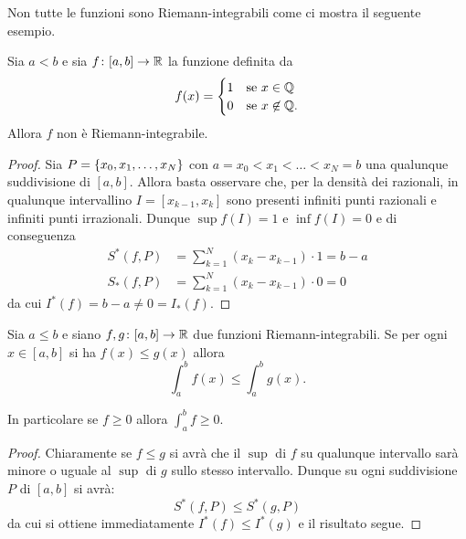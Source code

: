 Non tutte le funzioni sono Riemann-integrabili come ci mostra il seguente esempio.
\begin{example}
\mymark{**}
Sia $a<b$ e sia $f\colon[a,b]\to \mathbb R$ la funzione definita da
\[
 f(x) =
 \begin{cases}
   1 & \text{se $x\in \mathbb Q$}\\
   0 & \text{se $x\not \in \mathbb Q$}.
 \end{cases}
\]
Allora $f$ non è Riemann-integrabile.
\end{example}
%
\begin{proof}
\mymark{*}
Sia $P={\left\{ x_0, x_1, \dots, x_N \right\}}$ con $a=x_0 < x_1 < \dots < x_N = b$
una qualunque suddivisione di $[a,b]$.
Allora basta osservare che, per la densità dei razionali,
in qualunque intervallino $I=[x_{k-1}, x_k]$ sono presenti infiniti punti
razionali e infiniti punti irrazionali. Dunque $\sup f(I)=1$ e $\inf f(I)=0$ e di conseguenza
\begin{align*}
  S^*(f,P) &= \sum_{k=1}^N (x_k - x_{k-1})\cdot 1 = b-a \\
  S_*(f,P) &= \sum_{k=1}^N (x_k - x_{k-1})\cdot 0 = 0
\end{align*}
da cui $I^*(f) = b-a \neq 0 = I_*(f)$.
\end{proof}

\begin{theorem}
\mymark{*}
Sia $a\le b$ e siano
$f,g\colon [a,b]\to \mathbb R$ due funzioni Riemann-integrabili.
Se per ogni $x\in [a,b]$ si ha $f(x) \le g(x)$ allora
\[
  \int_a^b f(x) \le \int_a^b g(x).
\]

In particolare se $f\ge 0$ allora $\int_a^b f \ge 0$.
\end{theorem}
%
\begin{proof}
Chiaramente se $f \le g$ si avrà che il $\sup$ di $f$ su qualunque intervallo sarà minore o uguale al $\sup$ di $g$ sullo stesso intervallo. Dunque su ogni suddivisione $P$ di $[a,b]$ si avrà:
\[
  S^*(f,P) \le S^*(g,P)
\]
da cui si ottiene immediatamente $I^*(f) \le I^*(g)$ e il risultato segue.
\end{proof}

